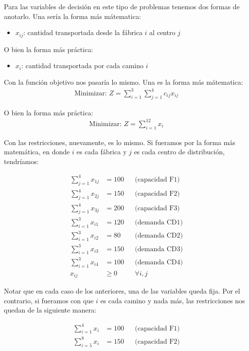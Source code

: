 \documentclass[12pt]{article}
\begin{document}
Para las variables de decisión en este tipo de problemas tenemos dos formas de anotarlo. Una sería la forma más mátematica:
\begin{itemize}
    \item $x_{ij}$: cantidad transportada desde la fábrica $i$ al centro $j$
\end{itemize}

O bien la forma más práctica:
\begin{itemize}
    \item $x_{i}$: cantidad transportada por cada camino $i$
\end{itemize}

Con la función objetivo nos pasaría lo mismo. Una es la forma más mátematica:
\begin{align*}
\text{Minimizar: } Z = \sum_{i=1}^3 \sum_{j=1}^4 c_{ij}x_{ij}
\end{align*}

O bien la forma más práctica:
\begin{align*}
\text{Minimizar: } Z = \sum_{i=1}^{12} x_{i}
\end{align*}

Con las restricciones, nuevamente, es lo mismo. Si fueramos por la forma más matemática, en donde $i$ es cada fábrica y $j$ es cada centro de distribución, tendríamos:

\begin{align*}
\sum_{j=1}^4 x_{1j} &= 100 && \text{(capacidad F1)} \\
\sum_{j=1}^4 x_{2j} &= 150 && \text{(capacidad F2)} \\
\sum_{j=1}^4 x_{3j} &= 200 && \text{(capacidad F3)} \\
\sum_{i=1}^3 x_{i1} &= 120 && \text{(demanda CD1)} \\
\sum_{i=1}^3 x_{i2} &= 80 && \text{(demanda CD2)} \\
\sum_{i=1}^3 x_{i3} &= 150 && \text{(demanda CD3)} \\
\sum_{i=1}^3 x_{i4} &= 100 && \text{(demanda CD4)} \\
x_{ij} &\geq 0 && \forall i,j
\end{align*}

Notar que en cada caso de los anteriores, una de las variables queda fija. Por el contrario, si fueramos con que $i$ es cada camino y nada más, las restricciones nos quedan de la siguiente manera:

\begin{align*}
\sum_{i=1}^{4} x_{i} &= 100 && \text{(capacidad F1)} \\
\sum_{i=5}^{8} x_{i} &= 150 && \text{(capacidad F2)} \\
\end{align*}
\end{document}
